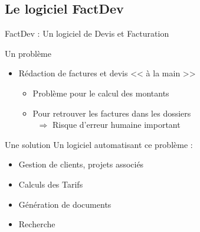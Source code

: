 \documentclass{beamer}
\begin{document}
\subsection{Le logiciel FactDev}
\begin{frame}{FactDev : Un logiciel de Devis et Facturation}
	\begin{block}{Un problème}
		\begin{itemize}
			\item Rédaction de factures et devis << à la main >> 
				\begin{itemize}
					\item Problème pour le calcul des montants
					\item Pour retrouver les factures dans les dossiers\\
						~$\Rightarrow$ Risque d'erreur humaine important
				\end{itemize}
		\end{itemize}
	\end{block}
	\vfill
	\begin{exampleblock}{Une solution}
		Un logiciel automatisant ce problème : 
		\begin{itemize}
			\item Gestion de clients, projets associés
			\item Calculs des Tarifs
			\item Génération de documents 
			\item Recherche
		\end{itemize}
	\end{exampleblock}
\end{frame}
\end{document}
